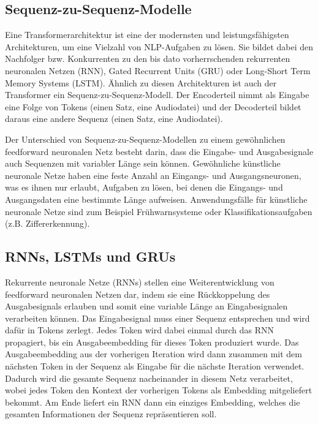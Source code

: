 \subsection{Sequenz-zu-Sequenz-Modelle}

Eine Transformerarchitektur ist eine der modernsten und leistungsfähigsten Architekturen, um eine Vielzahl von NLP-Aufgaben zu lösen.
Sie bildet dabei den Nachfolger bzw. Konkurrenten zu den bis dato vorherrschenden rekurrenten neuronalen Netzen (RNN), Gated Recurrent Units (GRU) oder Long-Short Term Memory Systems (LSTM).
Ähnlich zu diesen Architekturen ist auch der Transformer ein Sequenz-zu-Sequenz-Modell.
Der Encoderteil nimmt als Eingabe eine Folge von Tokens (einen Satz, eine Audiodatei) und der Decoderteil bildet daraus eine andere Sequenz (einen Satz, eine Audiodatei).

Der Unterschied von Sequenz-zu-Sequenz-Modellen zu einem gewöhnlichen feedforward neuronalen Netz besteht darin, dass die Eingabe- und Ausgabesignale auch Sequenzen mit variabler Länge sein können.
Gewöhnliche künstliche neuronale Netze haben eine feste Anzahl an Eingangs- und Ausgangsneuronen, was es ihnen nur erlaubt, Aufgaben zu lösen, bei denen die Eingangs- und Ausgangsdaten eine bestimmte Länge aufweisen.
Anwendungsfälle für künstliche neuronale Netze sind zum Beispiel Frühwarnsysteme oder Klassifikationsaufgaben (z.B. Ziffererkennung).

\subsection{RNNs, LSTMs und GRUs}

Rekurrente neuronale Netze (RNNs) stellen eine Weiterentwicklung von feedforward neuronalen Netzen dar, indem sie eine Rückkoppelung des Ausgabesignals erlauben und somit eine variable Länge an Eingabesignalen verarbeiten können.
Das Eingabesignal muss einer Sequenz entsprechen und wird dafür in Tokens zerlegt.
Jedes Token wird dabei einmal durch das RNN propagiert, bis ein Ausgabeembedding für dieses Token produziert wurde.
Das Ausgabeembedding aus der vorherigen Iteration wird dann zusammen mit dem nächsten Token in der Sequenz als Eingabe für die nächste Iteration verwendet.
Dadurch wird die gesamte Sequenz nacheinander in diesem Netz verarbeitet, wobei jedes Token den Kontext der vorherigen Tokens als Embedding mitgeliefert bekommt.
Am Ende liefert ein RNN dann ein einziges Embedding, welches die gesamten Informationen der Sequenz repräsentieren soll.

